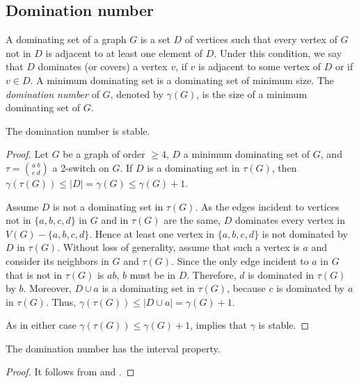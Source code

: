 \documentclass{BICA}
\begin{document}
\subsection{Domination number}\label{sectiondominationnumber}

A dominating set of a graph $G$ is a set $D$ of vertices such that every vertex of $G$ not in $D$ is adjacent to at least one element of $D$. Under this condition, we say that $D$ dominates (or covers) a vertex $v$, if $v$ is adjacent to some vertex of $D$ or if $v\in D$. A minimum dominating set is a dominating set of minimum size. The \emph{domination number} of $G$, denoted by $\gamma(G)$, is the size of a minimum dominating set of $G$.

\begin{theorem}
	\label{domin_stable}
	The domination number is stable.
\end{theorem}

\begin{proof}
	Let $G$ be a graph of order $\geq 4$, $D$ a minimum dominating set of $G$, and $\tau={{a \ b}\choose{c \ d}}$ a 2-switch on \(G\). If $D$ is a dominating set in $\tau(G)$, then $\gamma(\tau(G))\leq |D|=\gamma(G)\leq \gamma(G)+1$.

	Assume $D$ is not a dominating set in $\tau(G)$. As the edges incident to vertices not in $\{a,b,c,d\}$ in $G$ and in $\tau(G)$ are the same, $D$ dominates every vertex in $V(G)-\{a,b,c,d\}$. Hence at least one vertex in $\{a,b,c,d\}$ is not dominated by \(D\) in $\tau(G)$. Without loss of generality, assume that such a vertex is $a$ and consider its neighbors in \(G\) and \(\tau(G)\). Since the only edge incident to $a$ in $G$ that is not in $\tau(G)$ is $ab$, $b$ must be in $D$. Therefore, $d$ is dominated in $\tau(G)$ by $b$. Moreover, $D\cup a$ is a dominating set in $\tau(G)$, because $c$ is dominated by $a$ in $\tau(G)$. Thus, $\gamma(\tau(G))\leq |D\cup a|=\gamma(G)+1$.

	As in either case $\gamma(\tau(G))\leq \gamma(G)+1$,  implies that $\gamma$ is stable.
\end{proof}

\begin{theorem}
	The domination number has the interval property.
\end{theorem}

\begin{proof}
	It follows from  and .
\end{proof}
\end{document}
